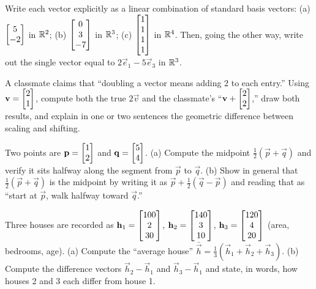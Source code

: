\begin{exercise}
\label{ch02:exr-basis}
Write each vector explicitly as a linear combination of standard basis vectors:
(a) $\begin{bmatrix}5\\-2\end{bmatrix}$ in $\mathbb{R}^2$; \quad
(b) $\begin{bmatrix}0\\3\\-7\end{bmatrix}$ in $\mathbb{R}^3$; \quad
(c) $\begin{bmatrix}1\\1\\1\\1\end{bmatrix}$ in $\mathbb{R}^4$.
Then, going the other way, write out the single vector equal to
$2\vec{e}_1 - 5\vec{e}_3$ in $\mathbb{R}^3$.
\end{exercise}

\begin{exercise}
\label{ch02:exr-trap}
A classmate claims that ``doubling a vector means adding $2$ to each entry.'' Using
$\mathbf{v}=\begin{bmatrix}2\\1\end{bmatrix}$, compute both the true $2\vec{v}$ and the classmate's
``$\mathbf{v}+\begin{bmatrix}2\\2\end{bmatrix}$,'' draw both results, and explain in one or two sentences the
geometric difference between scaling and shifting.
\end{exercise}

\begin{exercise}
\label{ch02:exr-midpoint}
Two points are $\mathbf{p}=\begin{bmatrix}1\\2\end{bmatrix}$ and $\mathbf{q}=\begin{bmatrix}5\\4\end{bmatrix}$.
(a) Compute the midpoint $\tfrac12(\vec{p}+\vec{q})$ and verify it sits halfway along the
segment from $\vec{p}$ to $\vec{q}$.
(b) Show in general that $\tfrac12(\vec{p}+\vec{q})$ is the midpoint by writing it as
$\vec{p} + \tfrac12(\vec{q}-\vec{p})$ and reading that as ``start at $\vec{p}$, walk
halfway toward $\vec{q}$.''
\end{exercise}

\begin{exercise}
\label{ch02:exr-data}
Three houses are recorded as $\mathbf{h}_1=\begin{bmatrix}100\\2\\30\end{bmatrix}$,
$\mathbf{h}_2=\begin{bmatrix}140\\3\\10\end{bmatrix}$, $\mathbf{h}_3=\begin{bmatrix}120\\4\\20\end{bmatrix}$ (area, bedrooms, age).
(a) Compute the ``average house'' $\bar{\vec{h}}=\tfrac13(\vec{h}_1+\vec{h}_2+\vec{h}_3)$.
(b) Compute the difference vectors $\vec{h}_2-\vec{h}_1$ and $\vec{h}_3-\vec{h}_1$ and
state, in words, how houses 2 and 3 each differ from house 1.
\end{exercise}

